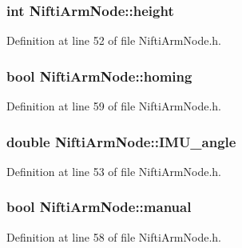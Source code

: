 \subsubsection[{height}]{\setlength{\rightskip}{0pt plus 5cm}int {\bf \-Nifti\-Arm\-Node\-::height}\hspace{0.3cm}{\ttfamily  [private]}}\label{classNiftiArmNode_a670ea3ba658dab826f630ecebf3c2612}


\-Definition at line 52 of file \-Nifti\-Arm\-Node.\-h.

\subsubsection[{homing}]{\setlength{\rightskip}{0pt plus 5cm}bool {\bf \-Nifti\-Arm\-Node\-::homing}\hspace{0.3cm}{\ttfamily  [private]}}\label{classNiftiArmNode_aae26fbe10dbc91e151532c7540d47c0f}


\-Definition at line 59 of file \-Nifti\-Arm\-Node.\-h.

\subsubsection[{\-I\-M\-U\-\_\-angle}]{\setlength{\rightskip}{0pt plus 5cm}double {\bf \-Nifti\-Arm\-Node\-::\-I\-M\-U\-\_\-angle}\hspace{0.3cm}{\ttfamily  [private]}}\label{classNiftiArmNode_a2894489f2368b9a67dd6679de8424ba9}


\-Definition at line 53 of file \-Nifti\-Arm\-Node.\-h.

\subsubsection[{manual}]{\setlength{\rightskip}{0pt plus 5cm}bool {\bf \-Nifti\-Arm\-Node\-::manual}\hspace{0.3cm}{\ttfamily  [private]}}\label{classNiftiArmNode_a7864ef069c845c992986ef4dccf0254a}


\-Definition at line 58 of file \-Nifti\-Arm\-Node.\-h.

